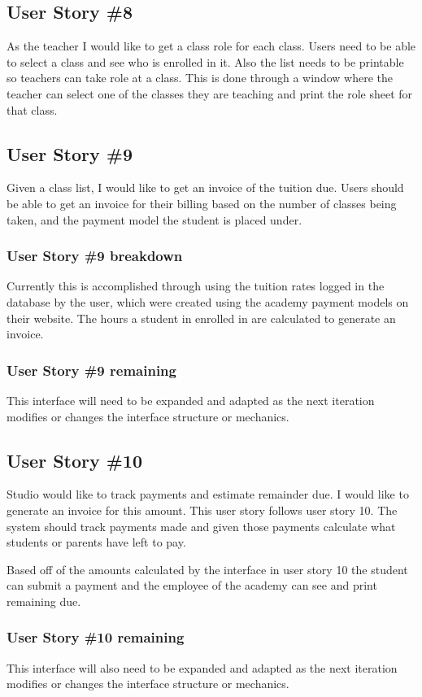 \subsection{User Story \#8}
As the teacher I would like to get a class role for each class. Users need to be able to select a class and see who is enrolled in it. Also the list needs to be printable so teachers can take role at a class. This is done through a window where the teacher can select one of the classes they are teaching and print the role sheet for that class.

\subsection{User Story \#9}
Given a class list, I would like to get an invoice of the tuition due. Users should be able to get an invoice for their billing based on the number of classes being taken, and the payment model the student is placed under.

\subsubsection{User Story \#9 breakdown}
Currently this is accomplished through using the tuition rates logged in the database by the user, which were created using the academy payment models on their website. The hours a student in enrolled in are calculated to generate an invoice.

\subsubsection{User Story \#9 remaining}
This interface will need to be expanded and adapted as the next iteration modifies or changes the interface structure or mechanics.


\subsection{User Story \#10}
Studio would like to track payments and estimate remainder due.  I would like to generate an invoice for this amount. This user story follows user story 10. The system should track payments made and given those payments calculate what students or parents have left to pay.

Based off of the amounts calculated by the interface in user story 10 the student can submit a payment and the employee of the academy can see and print remaining due.

\subsubsection{User Story \#10 remaining}
This interface will also need to be expanded and adapted as the next iteration modifies or changes the interface structure or mechanics.


